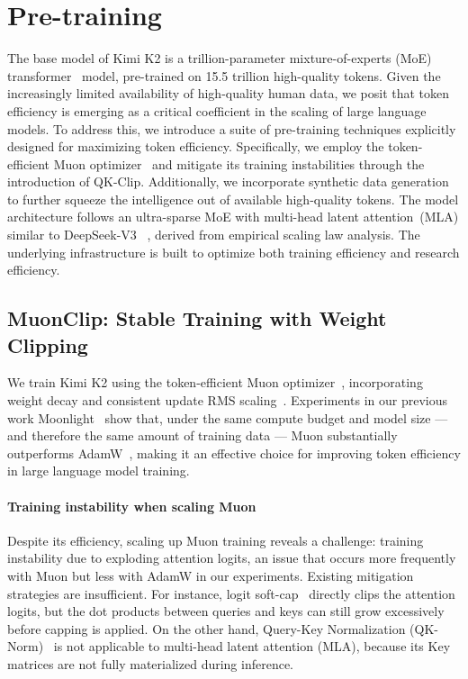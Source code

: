 \section{Pre-training}

The base model of Kimi K2 is a trillion-parameter mixture-of-experts (MoE) transformer~\citep{transformer} model, pre-trained on 15.5 trillion high-quality tokens. Given the increasingly limited availability of high-quality human data, we posit that token efficiency is emerging as a critical coefficient in the scaling of large language models. To address this, we introduce a suite of pre-training techniques explicitly designed for maximizing token efficiency. Specifically, we employ the token-efficient Muon optimizer~\citep{jordan2024muon,liu2025muon} and mitigate its training instabilities through the introduction of QK-Clip. Additionally, we incorporate synthetic data generation to further squeeze the intelligence out of available high-quality tokens. The model architecture follows an ultra-sparse MoE with multi-head latent attention~(MLA) similar to DeepSeek-V3~\citep{deepseekai2024deepseekv3technicalreport} , derived from empirical scaling law analysis. The underlying infrastructure is built to optimize both training efficiency and research efficiency.







\subsection{MuonClip: Stable Training with Weight Clipping}



We train Kimi K2 using the token-efficient Muon optimizer~\citep{jordan2024muon}, incorporating weight decay and consistent update RMS scaling~\citep{liu2025muon}. Experiments in our previous work Moonlight~\citep{liu2025muon} show that, under the same compute budget and model size --- and therefore the same amount of training data --- Muon substantially outperforms AdamW~\citep{adam2015kingma, loshchilov2018decoupled}, making it an effective choice for improving token efficiency in large language model training.

\paragraph{Training instability when scaling Muon}
Despite its efficiency, scaling up Muon training reveals a challenge: training instability due to exploding attention logits, an issue that occurs more frequently with Muon but less with AdamW in our experiments. Existing mitigation strategies are insufficient. For instance, logit soft-cap~\citep{team2024gemma} directly clips the attention logits, but the dot products between queries and keys can still grow excessively before capping is applied. On the other hand, Query-Key Normalization (QK-Norm)~\citep{dehghani2023scaling,wortsman2309small} is not applicable to multi-head latent attention (MLA), because its Key matrices are not fully materialized during inference.


